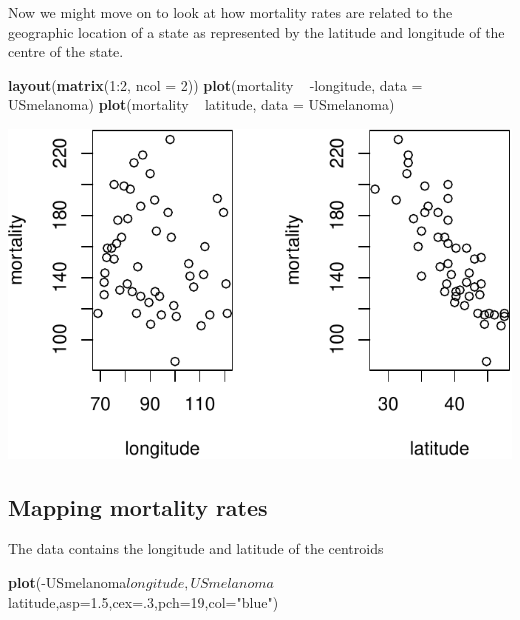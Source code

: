 \documentclass[]{article}
\newenvironment{Shaded}{\begin{snugshade}}{\end{snugshade}}
\newcommand{\KeywordTok}[1]{\textcolor[rgb]{0.13,0.29,0.53}{\textbf{{#1}}}}
\newcommand{\DataTypeTok}[1]{\textcolor[rgb]{0.13,0.29,0.53}{{#1}}}
\newcommand{\DecValTok}[1]{\textcolor[rgb]{0.00,0.00,0.81}{{#1}}}
\newcommand{\FloatTok}[1]{\textcolor[rgb]{0.00,0.00,0.81}{{#1}}}
\newcommand{\StringTok}[1]{\textcolor[rgb]{0.31,0.60,0.02}{{#1}}}
\newcommand{\NormalTok}[1]{{#1}}
\numberwithin{equation}{section}
\begin{document}
Now we might move on to look at how mortality rates are related to the
geographic location of a state as represented by the latitude and
longitude of the centre of the state.

\begin{Shaded}
\begin{Highlighting}[]
\KeywordTok{layout}\NormalTok{(}\KeywordTok{matrix}\NormalTok{(}\DecValTok{1}\NormalTok{:}\DecValTok{2}\NormalTok{, }\DataTypeTok{ncol =} \DecValTok{2}\NormalTok{))}
\KeywordTok{plot}\NormalTok{(mortality ~}\StringTok{ }\NormalTok{-longitude, }\DataTypeTok{data =} \NormalTok{USmelanoma)}
\KeywordTok{plot}\NormalTok{(mortality ~}\StringTok{ }\NormalTok{latitude, }\DataTypeTok{data =} \NormalTok{USmelanoma)}
\end{Highlighting}
\end{Shaded}

\begin{center}\includegraphics{index_files/figure-latex/unnamed-chunk-263-1} \end{center}

\subsection{Mapping mortality rates}\label{mapping-mortality-rates}

The data contains the longitude and latitude of the centroids

\begin{Shaded}
\begin{Highlighting}[]
\KeywordTok{plot}\NormalTok{(-USmelanoma$longitude,USmelanoma$latitude,}\DataTypeTok{asp=}\FloatTok{1.5}\NormalTok{,}\DataTypeTok{cex=}\NormalTok{.}\DecValTok{3}\NormalTok{,}\DataTypeTok{pch=}\DecValTok{19}\NormalTok{,}\DataTypeTok{col=}\StringTok{"blue"}\NormalTok{)}
\end{Highlighting}
\end{Shaded}
\end{document}
